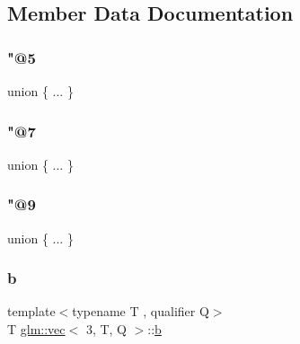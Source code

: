 \subsection{Member Data Documentation}
\mbox{\label{structglm_1_1vec_3_013_00_01_t_00_01_q_01_4_ada7288ef08e728dad196122ef5a24bc1}} 
\subsubsection{\texorpdfstring{"@5}{@5}}
{\footnotesize\ttfamily union \{ ... \} }

\mbox{\label{structglm_1_1vec_3_013_00_01_t_00_01_q_01_4_a3c73a68759d50909386cae51952769cf}} 
\subsubsection{\texorpdfstring{"@7}{@7}}
{\footnotesize\ttfamily union \{ ... \} }

\mbox{\label{structglm_1_1vec_3_013_00_01_t_00_01_q_01_4_a7d1b40636c9a66a087f10e0abf601990}} 
\subsubsection{\texorpdfstring{"@9}{@9}}
{\footnotesize\ttfamily union \{ ... \} }

\mbox{\label{structglm_1_1vec_3_013_00_01_t_00_01_q_01_4_a3bec3aae8fdbe58bc4a6354285609050}} 
\subsubsection{\texorpdfstring{b}{b}}
{\footnotesize\ttfamily template$<$typename T , qualifier Q$>$ \\
T \mbox{\hyperlink{structglm_1_1vec}{glm\+::vec}}$<$ 3, T, Q $>$\+::\mbox{\hyperlink{_s_d_l__opengl__glext_8h_a0f71581a41fd2264c8944126dabbd010}{b}}}

\mbox{\label{structglm_1_1vec_3_013_00_01_t_00_01_q_01_4_aa01fb9a90b9b739797a0f1ca96206570}} 
